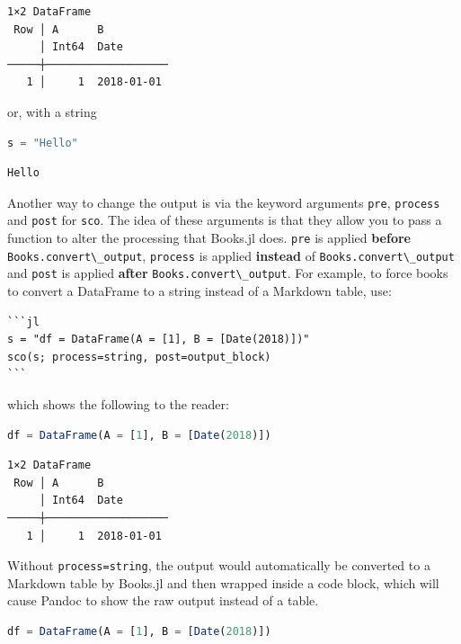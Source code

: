 \documentclass[
  notoc %
]{tufte-book}
\newcommand{\passthrough}[1]{#1}
\begin{document}
\begin{lstlisting}[language=Output]
1×2 DataFrame
 Row │ A      B
     │ Int64  Date
─────┼───────────────────
   1 │     1  2018-01-01
\end{lstlisting}

or, with a string

\begin{lstlisting}[language=Julia]
s = "Hello"
\end{lstlisting}

\begin{lstlisting}[language=Output]
Hello
\end{lstlisting}

Another way to change the output is via the keyword arguments
\passthrough{\lstinline!pre!}, \passthrough{\lstinline!process!} and
\passthrough{\lstinline!post!} for \passthrough{\lstinline!sco!}. The
idea of these arguments is that they allow you to pass a function to
alter the processing that Books.jl does. \passthrough{\lstinline!pre!}
is applied \textbf{before}
\passthrough{\lstinline!Books.convert\_output!},
\passthrough{\lstinline!process!} is applied \textbf{instead} of
\passthrough{\lstinline!Books.convert\_output!} and
\passthrough{\lstinline!post!} is applied \textbf{after}
\passthrough{\lstinline!Books.convert\_output!}. For example, to force
books to convert a DataFrame to a string instead of a Markdown table,
use:

\begin{lstlisting}
```jl
s = "df = DataFrame(A = [1], B = [Date(2018)])"
sco(s; process=string, post=output_block)
```
\end{lstlisting}

which shows the following to the reader:

\begin{lstlisting}[language=Julia]
df = DataFrame(A = [1], B = [Date(2018)])
\end{lstlisting}

\begin{lstlisting}[language=Output]
1×2 DataFrame
 Row │ A      B
     │ Int64  Date
─────┼───────────────────
   1 │     1  2018-01-01
\end{lstlisting}

Without \passthrough{\lstinline!process=string!}, the output would
automatically be converted to a Markdown table by Books.jl and then
wrapped inside a code block, which will cause Pandoc to show the raw
output instead of a table.

\begin{lstlisting}[language=Julia]
df = DataFrame(A = [1], B = [Date(2018)])
\end{lstlisting}
\end{document}

